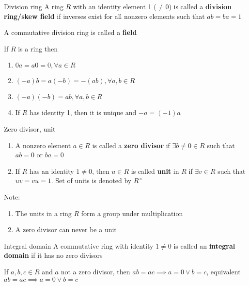 \documentclass[titlepage, 12pt]{book}
\begin{document}
\begin{definition}{Division ring}{}
    A ring $R$ with an identity element 1 ($\neq 0$) is called a
    \textbf{division ring/skew field} if inverses exist for all nonzero elements
    such that $ab=ba=1$
\end{definition}

A commutative division ring is called a \textbf{field}

\begin{proposition}{}{}
    If $R$ is a ring then
    \begin{enumerate}
        \item $0a=a0=0, \forall a\in R$
        \item $(-a)b=a(-b)=-(ab), \forall a,b\in R$
        \item $(-a)(-b) = ab,\forall a,b\in R$
        \item If $R$ has identity 1, then it is unique and $-a = (-1)a$
    \end{enumerate}
\end{proposition}

\begin{definition}{Zero divisor, unit}{}
    \begin{enumerate}
        \item A nonzero element $a\in R$ is called a \textbf{zero divisor} if
        $\exists b\neq 0\in R$ such that $ab=0$ or $ba=0$
        \item If $R$ has an identity $1\neq 0$, then $u\in R$ is called
        \textbf{unit} in $R$ if $\exists v\in R$ such that $uv=vu=1$. Set of
        units is denoted by $R^\times$
    \end{enumerate}
\end{definition}
 Note:
\begin{enumerate}
    \item The units in a ring $R$ form a group under multiplication
    \item A zero divisor can never be a unit
\end{enumerate}

\begin{definition}{Integral domain}{}
    A commutative ring with identity $1\neq 0$ is called an \textbf{integral
    domain} if it has no zero divisors
\end{definition}

\begin{proposition}{}{}
    If $a,b,c\in R$ and $a$ not a zero divisor, then $ab=ac\implies a = 0 \lor b =
    c$, equivalent $ab=ac\implies a = 0\lor b = c$
\end{proposition}
\end{document}
